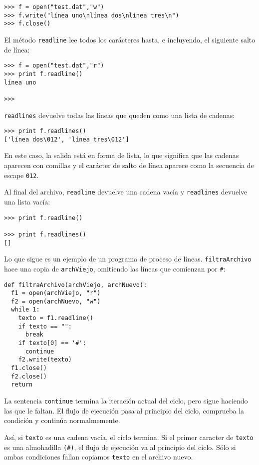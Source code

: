 \beforeverb
\begin{verbatim}
>>> f = open("test.dat","w")
>>> f.write("línea uno\nlínea dos\nlínea tres\n")
>>> f.close()
\end{verbatim}
\afterverb
%
El método \texttt{readline} lee todos los carácteres hasta, e incluyendo, el
siguiente salto de línea:

\beforeverb
\begin{verbatim}
>>> f = open("test.dat","r")
>>> print f.readline()
línea uno

>>>
\end{verbatim}
\afterverb
%
\texttt{readlines} devuelve todas las líneas que queden como una lista de
cadenas:

\beforeverb
\begin{verbatim}
>>> print f.readlines()
['línea dos\012', 'línea tres\012']
\end{verbatim}
\afterverb
%
En este caso, la salida está en forma de lista, lo que significa que
las cadenas aparecen con comillas y el carácter de salto de línea
aparece como la secuencia de escape \texttt{012}.

Al final del archivo, \texttt{readline} devuelve una cadena vacía y
\texttt{readlines} devuelve una lista vacía:

\beforeverb
\begin{verbatim}
>>> print f.readline()

>>> print f.readlines()
[]
\end{verbatim}
\afterverb
%
Lo que sigue es un ejemplo de un programa de proceso de líneas.
\texttt{filtraArchivo} hace una copia de \texttt{archViejo}, omitiendo
las líneas que comienzan por \texttt{\#}:

\beforeverb
\begin{verbatim}
def filtraArchivo(archViejo, archNuevo):
  f1 = open(archViejo, "r")
  f2 = open(archNuevo, "w")
  while 1:
    texto = f1.readline()
    if texto == "":
      break
    if texto[0] == '#':
      continue
    f2.write(texto)
  f1.close()
  f2.close()
  return
\end{verbatim}
\afterverb
%
La sentencia \texttt{continue} termina la iteración actual del ciclo,
pero sigue haciendo las que le faltan. El flujo de ejecución pasa al principio
del ciclo, comprueba la condición y continúa normalmemente.


Así, si \texttt{texto} es una cadena vacía, el ciclo termina. Si el primer
caracter de \texttt{texto} es una almohadilla \texttt{(\#)}, el flujo de ejecución va al
principio del ciclo. Sólo si ambas condiciones fallan copiamos \texttt{texto}
en el archivo nuevo.


